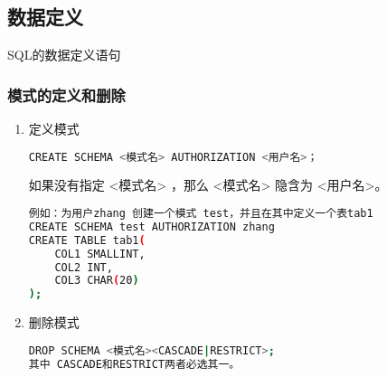 \subsection{数据定义}
SQL的数据定义语句





\subsubsection{模式的定义和删除}
\begin{enumerate}
\item 定义模式
\begin{lstlisting}[language=bash]
CREATE SCHEMA <模式名> AUTHORIZATION <用户名>；
\end{lstlisting}
如果没有指定 <模式名> ，那么 <模式名> 隐含为 <用户名>。

\begin{lstlisting}[language=bash]
例如：为用户zhang 创建一个模式 test，并且在其中定义一个表tab1
CREATE SCHEMA test AUTHORIZATION zhang
CREATE TABLE tab1(
    COL1 SMALLINT,
    COL2 INT,
    COL3 CHAR(20)
);

\end{lstlisting}
\item 删除模式
\begin{lstlisting}[language=bash]
DROP SCHEMA <模式名><CASCADE|RESTRICT>;
其中 CASCADE和RESTRICT两者必选其一。
\end{lstlisting}
\end{enumerate}
